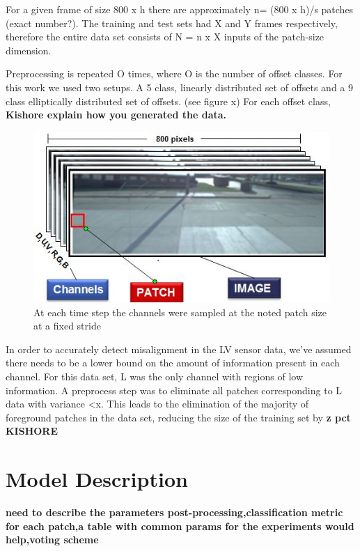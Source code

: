 \documentclass{article}
\begin{document}
For a given frame of size 800 x h there are approximately n= (800 x h)/s patches (exact number?). The training and test sets had X and Y frames respectively, therefore the entire data set consists of  N = n x X inputs of the patch-size dimension. 

Preprocessing is repeated O times, where O is the number of offset classes. For this work we used two setups. A 5 class, linearly distributed set of offsets and a 9 class elliptically distributed set of offsets. (see figure x) For each offset class, \textbf{Kishore explain how you generated the data.} 

\begin{figure}[htbp]
        \includegraphics[scale=0.65]{Figures/ImagePatchChannel.jpg}
    \caption{At each time step the channels were sampled at the noted patch size at a fixed stride}
    \label{fig:ImageChStride}
\end{figure}

In order to accurately detect misalignment in the LV sensor data, we've assumed there needs to be a lower bound on the amount of information present in each channel. For this data set, L was the only channel with regions of low information. A preprocess step was to eliminate all patches corresponding to L data with variance <x. This leads to the elimination of the majority of foreground patches in the data set, reducing the size of the training set by \textbf{z pct KISHORE}



\section{Model Description}
\textbf{need to describe the parameters post-processing,classification metric for each patch,a table with common params for the experiments would help,voting scheme}
\end{document}
